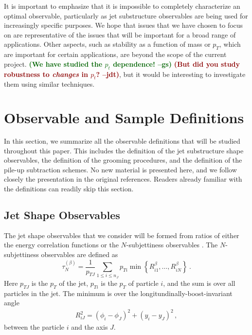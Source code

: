 \documentclass[11pt,letterpaper]{article}
\newcommand{\Nsub}[2]{\tau_{#1}^{(#2)}}
\newcommand{\jdt}[1]{\textbf{\textcolor{darkred}{(#1 --jdt)}}}
\newcommand{\gs}[1]{\textbf{\textcolor{darkgreen}{(#1 --gs)}}}
\begin{document}
It is important to emphasize that it is impossible to completely
characterize an optimal observable, particularly as jet substructure
observables are being used for increasingly specific
purposes.
%
We hope that issues that we have chosen to focus on
are representative of the issues that will be important for a broad
range of applications.
%
Other aspects, such as stability as a function
of mass or $p_T$, which are important for certain applications, are
beyond the scope of the current project. \gs{We have studied the $p_t$
  dependence!} \jdt{But did you study robustness to \emph{changes} in $p_t$?},
  but it would be interesting to investigate them
using similar techniques.


\section{Observable and Sample Definitions}\label{sec:obs_def}

In this section, we summarize all the observable definitions that will be studied throughout this paper.
%
This includes the definition of the jet substructure shape observables, the definition of the grooming procedures, and the definition of the pile-up subtraction schemes.
%
No new material is presented here, and we follow closely the presentation in the original references.
%
Readers already familiar with the definitions can readily skip this section.



\subsection{Jet Shape Observables}\label{sec:shape_def}

The jet shape observables that we consider will be formed from ratios of either the energy correlation functions \cite{Larkoski:2013eya,Moult:2016cvt} or the $N$-subjettiness observables \cite{Thaler:2010tr,Thaler:2011gf}.
%
The $N$-subjettiness observables are defined as \cite{Stewart:2010tn,Thaler:2010tr,Thaler:2011gf}
%
\begin{equation}\label{eq:nsubdef}
\Nsub{N}{\beta} = \frac{1}{p_{TJ}}\sum_{1\leq i \leq n_J} p_{Ti}\min\left\{
R_{i1}^\beta,\dotsc,R_{iN}^\beta
\right\} \ .
\end{equation}
%
Here $p_{TJ}$ is the $p_T$ of the jet, $p_{Ti}$ is the $p_T$ of particle $i$, and the sum is over all particles in the jet.
%
The minimum is over the longitundinally-boost-invariant angle
%
\begin{align}\label{eq:ptratio}  
R_{iJ}^2 = (\phi_i-\phi_J)^2+(y_i-y_J)^2\,,
\end{align}
%
between the particle $i$ and the axis $J$.
\end{document}
